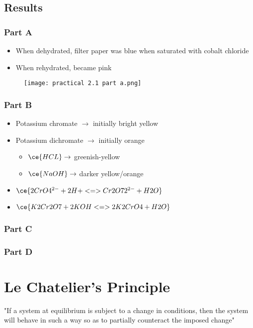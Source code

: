 			\subsection{Results}
				\subsubsection{Part A}
					\begin{itemize}
						\item When dehydrated, filter paper was blue when saturated with cobalt chloride
						\item When rehydrated, became pink
					\end{itemize}
					\begin{figure}[H]
						\centering
						\texttt{[image: practical 2.1 part a.png]}
					\end{figure}

				\subsubsection{Part B}
					\begin{itemize}
						\item Potassium chromate $\rightarrow$ initially bright yellow
						\item Potassium dichromate $\rightarrow$ initially orange
						\begin{itemize}
							\item $\ce{HCL} \rightarrow$ greenish-yellow
							\item $\ce{NaOH} \rightarrow$ darker yellow/orange
						\end{itemize}
						\item $\ce{2CrO4^{2-} + 2H+ <=> Cr2O72^{2-} + H2O}$
						\item $\ce{K2Cr2O7 + 2KOH <=> 2K2CrO4 + H2O}$
					\end{itemize}
				\subsubsection{Part C}
				\subsubsection{Part D}

\section{Le Chatelier's Principle} \label{29/10/2024-31/10/2024}
	"If a system at equilibrium is subject to a change in conditions, then the system will behave in such a way so as to partially counteract the imposed change"

